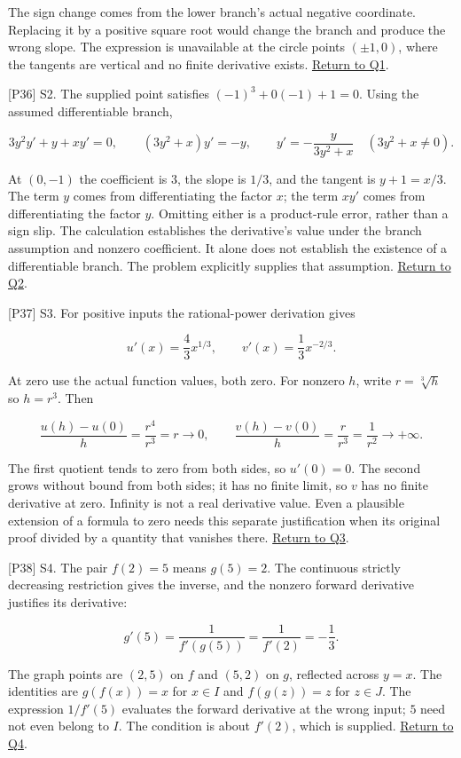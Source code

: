\documentclass[
  11pt,
]{article}
\begin{document}
The sign change comes from the lower branch's actual negative
coordinate. Replacing it by a positive square root would change the
branch and produce the wrong slope. The expression is unavailable at the
circle points \((\pm1,0)\), where the tangents are vertical and no
finite derivative exists. \protect\hyperlink{q1}{Return to Q1}.

{[}P36{]} S2. The supplied point satisfies \((-1)^3+0(-1)+1=0\). Using
the assumed differentiable branch,

\[
3y^2y'+y+xy'=0,
\qquad (3y^2+x)y'=-y,
\qquad y'=-\frac{y}{3y^2+x}\quad(3y^2+x\ne0).
\]

At \((0,-1)\) the coefficient is \(3\), the slope is \(1/3\), and the
tangent is \(y+1=x/3\). The term \(y\) comes from differentiating the
factor \(x\); the term \(xy'\) comes from differentiating the factor
\(y\). Omitting either is a product-rule error, rather than a sign slip.
The calculation establishes the derivative's value under the branch
assumption and nonzero coefficient. It alone does not establish the
existence of a differentiable branch. The problem explicitly supplies
that assumption. \protect\hyperlink{q2}{Return to Q2}.

{[}P37{]} S3. For positive inputs the rational-power derivation gives

\[
u'(x)=\frac43x^{1/3},\qquad
v'(x)=\frac13x^{-2/3}.
\]

At zero use the actual function values, both zero. For nonzero \(h\),
write \(r=\sqrt[3]{h}\) so \(h=r^3\). Then

\[
\frac{u(h)-u(0)}h=\frac{r^4}{r^3}=r\longrightarrow0,
\qquad
\frac{v(h)-v(0)}h=\frac{r}{r^3}=\frac1{r^2}\longrightarrow+\infty.
\]

The first quotient tends to zero from both sides, so \(u'(0)=0\). The
second grows without bound from both sides; it has no finite limit, so
\(v\) has no finite derivative at zero. Infinity is not a real
derivative value. Even a plausible extension of a formula to zero needs
this separate justification when its original proof divided by a
quantity that vanishes there. \protect\hyperlink{q3}{Return to Q3}.

{[}P38{]} S4. The pair \(f(2)=5\) means \(g(5)=2\). The continuous
strictly decreasing restriction gives the inverse, and the nonzero
forward derivative justifies its derivative:

\[
g'(5)=\frac1{f'(g(5))}=\frac1{f'(2)}=-\frac13.
\]

The graph points are \((2,5)\) on \(f\) and \((5,2)\) on \(g\),
reflected across \(y=x\). The identities are \(g(f(x))=x\) for
\(x\in I\) and \(f(g(z))=z\) for \(z\in J\). The expression \(1/f'(5)\)
evaluates the forward derivative at the wrong input; \(5\) need not even
belong to \(I\). The condition is about \(f'(2)\), which is supplied.
\protect\hyperlink{q4}{Return to Q4}.
\end{document}
